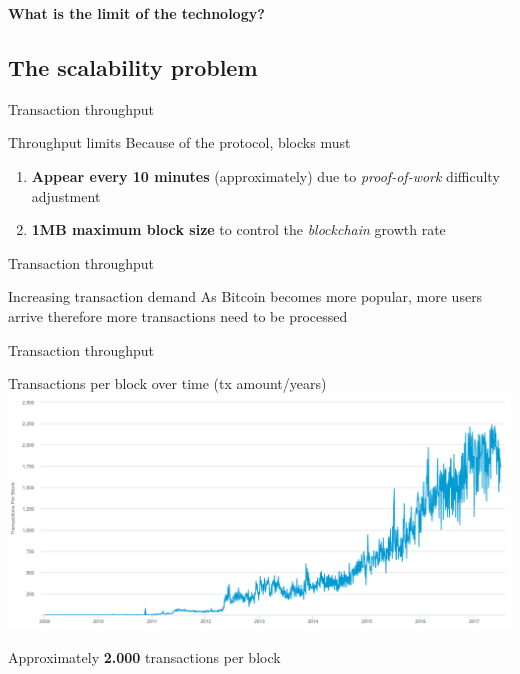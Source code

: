 \documentclass{beamer}
\begin{document}
\begin{frame}
 \begin{center}
  \textbf{What is the limit of the technology?}
 \end{center}
\end{frame}
\subsection{The scalability problem}
\begin{frame}{Transaction throughput}
 \begin{block}{Throughput limits}
  Because of the protocol, blocks must
  \begin{enumerate}
   \item \textbf{Appear every 10 minutes} (approximately) due to \textit{proof-of-work} difficulty adjustment
   \item \textbf{1MB maximum block size} to control the \textit{blockchain} growth rate
  \end{enumerate}
 \end{block}
\end{frame}
\begin{frame}{Transaction throughput}
  \begin{alertblock}{Increasing transaction demand}
   As Bitcoin becomes more popular, more users arrive therefore more transactions need to be processed
  \end{alertblock}
\end{frame}
\begin{frame}{Transaction throughput}
 \begin{center}
  Transactions per block over time (tx amount/years)\\
  \includegraphics[width=\textwidth, height=0.8\textheight, keepaspectratio]{img/chart_block_transactions.png}
 \end{center}
 \begin{center}
  Approximately \textbf{2.000} transactions per block
 \end{center}
\end{frame}
\end{document}
